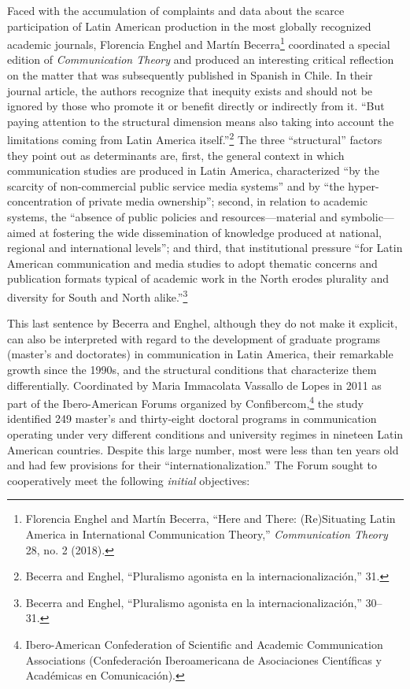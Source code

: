 \documentclass{tufte-handout}
\begin{document}
Faced with the accumulation of complaints and data about the scarce
participation of Latin American production in the most globally
recognized academic journals, Florencia Enghel and Martín
Becerra\footnote{Florencia Enghel and Martín Becerra, ``Here and There:
  (Re)Situating Latin America in International Communication Theory,''
  \emph{Communication Theory} 28, no. 2 (2018).} coordinated a special
edition of \emph{Communication Theory} and produced an interesting
critical reflection on the matter that was subsequently published in
Spanish in Chile. In their journal article, the authors recognize that
inequity exists and should not be ignored by those who promote it or
benefit directly or indirectly from it. ``But paying attention to the
structural dimension means also taking into account the limitations
coming from Latin America itself.''\footnote{Becerra and Enghel,
  ``Pluralismo agonista en la internacionalización,'' 31.} The three
``structural'' factors they point out as determinants are, first, the
general context in which communication studies are produced in Latin
America, characterized ``by the scarcity of non-commercial public
service media systems'' and by ``the hyper-concentration of private
media ownership''; second, in relation to academic systems, the
``absence of public policies and resources---material and
symbolic---aimed at fostering the wide dissemination of knowledge
produced at national, regional and international levels''; and third,
that institutional pressure ``for Latin American communication and media
studies to adopt thematic concerns and publication formats typical of
academic work in the North erodes plurality and diversity for South and
North alike.''\footnote{Becerra and Enghel, ``Pluralismo agonista en la
  internacionalización,'' 30--31.}

  \enlargethispage{\baselineskip}

This last sentence by Becerra and Enghel, although they do not make it
explicit, can also be interpreted with regard to the development of
graduate programs (master's and doctorates) in communication in Latin
America, their remarkable growth since the 1990s, and the structural
conditions that characterize them differentially. Coordinated by Maria
Immacolata Vassallo de Lopes in 2011 as part of the Ibero-American
Forums organized by Confibercom,\footnote{Ibero-American Confederation
  of Scientific and Academic Communication Associations (Confederación
  Iberoamericana de Asociaciones Científicas y Académicas en
  Comunicación).} the study identified 249 master's and thirty-eight
doctoral programs in communication operating under very different
conditions and university regimes in nineteen Latin American countries.
Despite this large number, most were less than ten years old and had few
provisions for their ``internationalization.'' The Forum sought to
cooperatively meet the following \emph{initial} objectives:
\end{document}
